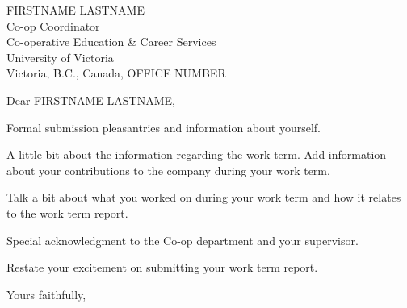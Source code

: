 \documentclass[12pt]{letter}
\begin{document}
\begin{letter}{
	FIRSTNAME LASTNAME \\
	Co-op Coordinator \\
	Co-operative Education \& Career Services \\
	University of Victoria \\
	Victoria, B.C., Canada, OFFICE NUMBER
}

\date{MONTH DAY, YEAR}			%

\opening{Dear FIRSTNAME LASTNAME,}
\medskip

Formal submission pleasantries and information about yourself. \newline

A little bit about the information regarding the work term. Add information about your contributions to the company during your work term. \newline

Talk a bit about what you worked on during your work term and how it relates to the work term report. \newline

Special acknowledgment to the Co-op department and your supervisor. \newline

Restate your excitement on submitting your work term report.

\closing{Yours faithfully,}

\end{letter}
\end{document}
